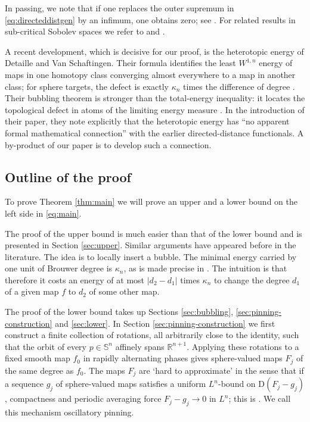 \documentclass[11pt,reqno]{amsart}
\numberwithin{equation}{section}
\newcommand{\Sph}{\mathbb S}
\newcommand{\R}{\mathbb R}
\newcommand{\D}{\mathrm D}
\begin{document}
In passing, we note that if one replaces the outer supremum in \eqref{eq:directeddistgen} by an infimum, one obtains zero; see \cite[Theorem~4(1)]{BrezisMironescuShafrir2016}. For related results in sub-critical Sobolev spaces we refer to \cite[Theorem~3.4]{LeviShafrir2014} and \cite[Theorem~1 and Remark~2.1]{RubinsteinShafrir2007}.

A recent development, which is decisive for our proof, is the heterotopic energy of Detaille and Van Schaftingen.  Their formula identifies the least $W^{1,n}$ energy of maps in one homotopy class converging almost everywhere to a map in another class; for sphere targets, the defect is exactly $\kappa_n$ times the difference of degree \cite[Theorem~1.1 and Corollary~1.2]{DetailleVanSchaftingen}.  Their bubbling theorem is stronger than the total-energy inequality: it locates the topological defect in atoms of the limiting energy measure \cite[Theorem~5.1]{DetailleVanSchaftingen}. In the introduction of their paper, they note explicitly that the heterotopic energy has ``no apparent formal mathematical connection'' with the earlier directed-distance functionals. A by-product of our paper is to develop such a connection.


\subsection*{Outline of the proof}

To prove Theorem \ref{thm:main} we will prove an upper and a lower bound on the left side in \eqref{eq:main}.

The proof of the upper bound is much easier than that of the lower bound and is presented in Section \ref{sec:upper}. Similar arguments have appeared before in the literature. The idea is to locally insert a bubble. The minimal energy carried by one unit of Brouwer degree is $\kappa_n$, as is made precise in . The intuition is that therefore it costs an energy of at most $|d_2-d_1|$ times $\kappa_n$ to change the degree $d_1$ of a given map $f$ to $d_2$ of some other map.

The proof of the lower bound takes up Sections \ref{sec:bubbling}, \ref{sec:pinning-construction} and 
\ref{sec:lower}. In Section \ref{sec:pinning-construction} we first construct a finite collection of rotations, all arbitrarily close to the identity, such that the orbit of every $p\in\Sph^n$ affinely spans $\R^{n+1}$.  Applying these rotations to a fixed smooth map $f_0$ in rapidly alternating phases gives sphere-valued maps $F_j$ of the same degree as $f_0$. The maps $F_j$ are `hard to approximate' in the sense that if a sequence $g_j$ of sphere-valued maps satisfies a uniform $L^n$-bound on $\D(F_j-g_j)$, compactness and periodic averaging force $F_j-g_j\to0$ in $L^n$; this is . We call this mechanism oscillatory pinning.
\end{document}
